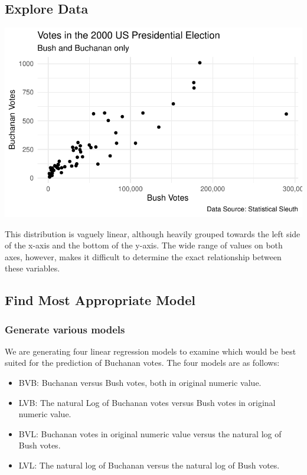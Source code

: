\documentclass[
  letterpaper,
  DIV=11,
  numbers=noendperiod]{scrartcl}
\providecommand{\tightlist}{%
  \setlength{\itemsep}{0pt}\setlength{\parskip}{0pt}}\usepackage{longtable,booktabs,array}
\begin{document}
\hypertarget{explore-data}{%
\subsection{Explore Data}\label{explore-data}}

\includegraphics{sds-291_s-24_case-study-template_files/figure-pdf/unnamed-chunk-3-1.pdf}

This distribution is vaguely linear, although heavily grouped towards
the left side of the x-axis and the bottom of the y-axis. The wide range
of values on both axes, however, makes it difficult to determine the
exact relationship between these variables.

\hypertarget{find-most-appropriate-model}{%
\subsection{Find Most Appropriate
Model}\label{find-most-appropriate-model}}

\hypertarget{generate-various-models}{%
\subsubsection{Generate various models}\label{generate-various-models}}

We are generating four linear regression models to examine which would
be best suited for the prediction of Buchanan votes. The four models are
as follows:

\begin{itemize}
\tightlist
\item
  BVB: Buchanan versus Bush votes, both in original numeric value.
\item
  LVB: The natural Log of Buchanan votes versus Bush votes in original
  numeric value.
\item
  BVL: Buchanan votes in original numeric value versus the natural log
  of Bush votes.
\item
  LVL: The natural log of Buchanan versus the natural log of Bush votes.
\end{itemize}
\end{document}
